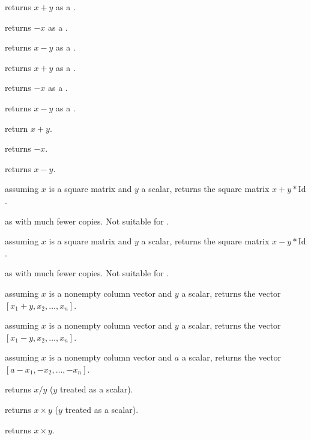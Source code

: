  returns $x + y$ as a .

 returns $-x$ as a .

 returns $x - y$ as a .

 returns $x + y$ as a .

 returns $-x$ as a .

 returns $x - y$ as a .

 return $x+y$.

 returns $-x$.

 returns $x-y$.

 assuming $x$ is a square matrix
and $y$ a scalar, returns the square matrix $x + y*\text{Id}$.

 as  with much
fewer copies. Not suitable for .

 assuming $x$ is a square matrix
and $y$ a scalar, returns the square matrix $x - y*\text{Id}$.

 as  with much
fewer copies. Not suitable for .

 assuming $x$ is a nonempty column vector
and $y$ a scalar, returns the vector $[x_1 + y, x_2,\dots,x_n]$.

 assuming $x$ is a nonempty column vector
and $y$ a scalar, returns the vector $[x_1 - y, x_2,\dots,x_n]$.

 assuming $x$ is a nonempty column vector
and $a$ a scalar, returns the vector $[a - x_1, -x_2,\dots,-x_n]$.


 returns $x/y$ ($y$ treated as a scalar).



 returns $x\times y$ ($y$ treated as a
scalar).

 returns $x\times y$.

